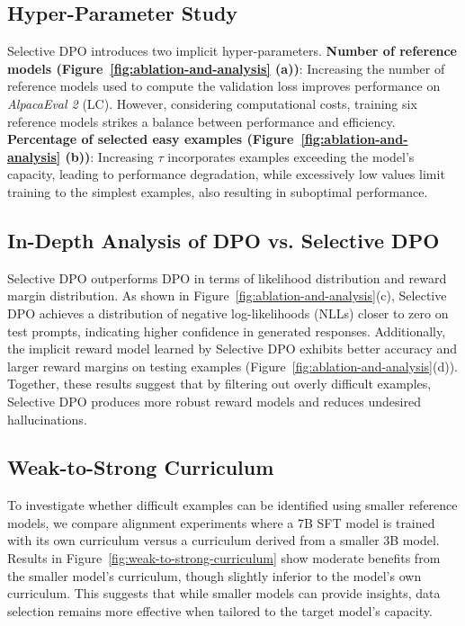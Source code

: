 \subsection{Hyper-Parameter Study}
Selective DPO introduces two implicit hyper-parameters. \textbf{Number of reference models (Figure~\ref{fig:ablation-and-analysis} (a))}: Increasing the number of reference models used to compute the validation loss improves performance on \textit{AlpacaEval 2} (LC). However, considering computational costs, training six reference models strikes a balance between performance and efficiency. 
\textbf{Percentage of selected easy examples (Figure~\ref{fig:ablation-and-analysis} (b))}: 
Increasing $\tau$ incorporates examples exceeding the model’s capacity, leading to performance degradation, while excessively low values limit training to the simplest examples, also resulting in suboptimal performance.

\subsection{In-Depth Analysis of DPO vs. Selective DPO}
Selective DPO outperforms DPO in terms of likelihood distribution and reward margin distribution. As shown in Figure~\ref{fig:ablation-and-analysis}(c), Selective DPO achieves a distribution of negative log-likelihoods (NLLs) closer to zero on test prompts, indicating higher confidence in generated responses. Additionally, the implicit reward model learned by Selective DPO exhibits better accuracy and larger reward margins on testing examples (Figure~\ref{fig:ablation-and-analysis}(d)). Together, these results suggest that by filtering out overly difficult examples, Selective DPO produces more robust reward models and reduces undesired hallucinations.

\subsection{Weak-to-Strong Curriculum}
To investigate whether difficult examples can be identified using smaller reference models, we compare alignment experiments where a 7B SFT model is trained with its own curriculum versus a curriculum derived from a smaller 3B model. 
Results in Figure~\ref{fig:weak-to-strong-curriculum} show moderate benefits from the smaller model’s curriculum, though slightly inferior to the model’s own curriculum. This suggests that while smaller models can provide insights, data selection remains more effective when tailored to the target model’s capacity.
